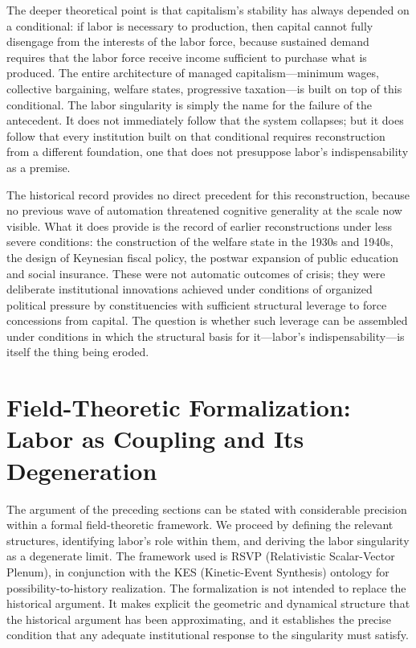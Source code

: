 \documentclass[11pt, a4paper]{article}
\theoremstyle{plain}
\theoremstyle{definition}
\begin{document}
The deeper theoretical point is that capitalism's stability has always depended
on a conditional: if labor is necessary to production, then capital cannot
fully disengage from the interests of the labor force, because sustained demand
requires that the labor force receive income sufficient to purchase what is
produced. The entire architecture of managed capitalism---minimum wages,
collective bargaining, welfare states, progressive taxation---is built on top
of this conditional. The labor singularity is simply the name for the failure
of the antecedent. It does not immediately follow that the system collapses;
but it does follow that every institution built on that conditional requires
reconstruction from a different foundation, one that does not presuppose
labor's indispensability as a premise.

The historical record provides no direct precedent for this reconstruction,
because no previous wave of automation threatened cognitive generality at the
scale now visible. What it does provide is the record of earlier reconstructions
under less severe conditions: the construction of the welfare state in the
1930s and 1940s, the design of Keynesian fiscal policy, the postwar expansion
of public education and social insurance. These were not automatic outcomes of
crisis; they were deliberate institutional innovations achieved under conditions
of organized political pressure by constituencies with sufficient structural
leverage to force concessions from capital. The question is whether such
leverage can be assembled under conditions in which the structural basis for
it---labor's indispensability---is itself the thing being eroded.

\section{Field-Theoretic Formalization: Labor as Coupling and Its Degeneration}

The argument of the preceding sections can be stated with considerable
precision within a formal field-theoretic framework. We proceed by defining
the relevant structures, identifying labor's role within them, and deriving
the labor singularity as a degenerate limit. The framework used is RSVP
(Relativistic Scalar-Vector Plenum), in conjunction with the KES
(Kinetic-Event Synthesis) ontology for possibility-to-history realization.
The formalization is not intended to replace the historical argument. It makes
explicit the geometric and dynamical structure that the historical argument
has been approximating, and it establishes the precise condition that any
adequate institutional response to the singularity must satisfy.
\end{document}

